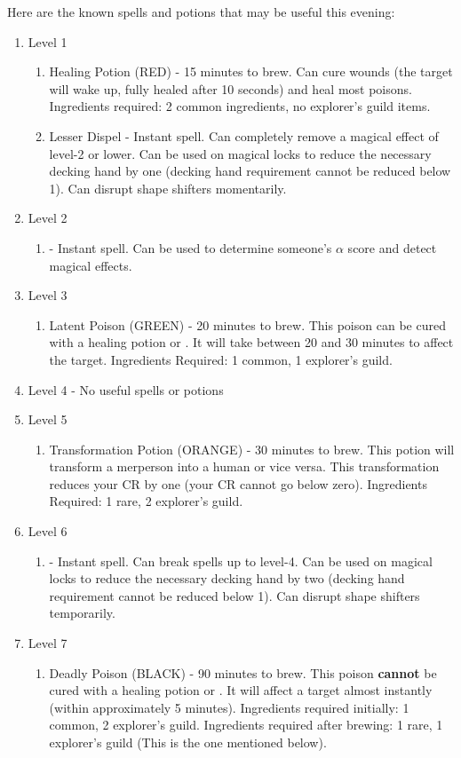 \documentclass[green]{NeptuneBall}
\begin{document}
Here are the known spells and potions that may be useful this evening: %
\begin{enumerate}
  \item Level 1
   \begin{enumerate}
     \item Healing Potion (RED) - 15 minutes to brew. Can cure wounds (the target will wake up, fully healed after 10 seconds) and heal most poisons. Ingredients required: 2 common ingredients, no explorer's guild items.
     \item Lesser Dispel - Instant spell. Can completely remove a magical effect of level-2 or lower. Can be used on magical locks to reduce the necessary decking hand by one (decking hand requirement cannot be reduced below 1). Can disrupt shape shifters momentarily.
   \end{enumerate}
  \item Level 2
   \begin{enumerate}
     \item \aPerceive{} - Instant spell. Can be used to determine someone's $\alpha$ score and detect magical effects.
   \end{enumerate}
  \item Level 3
     \begin{enumerate}
     \item Latent Poison (GREEN) - 20 minutes to brew. This poison can be cured with a healing potion or \aFirstAid{}. It will take between 20 and 30 minutes to affect the target. Ingredients Required: 1 common, 1 explorer's guild.
   \end{enumerate}
   \item Level 4 - No useful spells or potions
   \item Level 5
    \begin{enumerate}
     \item Transformation Potion (ORANGE) - 30 minutes to brew. This potion will transform a merperson into a human or vice versa. This transformation reduces your CR by one (your CR cannot go below zero). Ingredients Required: 1 rare, 2 explorer's guild.
   \end{enumerate}
   \item Level 6
    \begin{enumerate}
      \item \aGreaterDispel{} - Instant spell. Can break spells up to level-4. Can be used on magical locks to reduce the necessary decking hand by two (decking hand requirement cannot be reduced below 1). Can disrupt shape shifters temporarily.
    \end{enumerate}
   \item Level 7
    \begin{enumerate}
      \item Deadly Poison (BLACK) - 90 minutes to brew. This poison {\bf cannot} be cured with a healing potion or \aFirstAid{}. It will affect a target almost instantly (within approximately 5 minutes). Ingredients required initially: 1 common, 2 explorer's guild. Ingredients required after brewing: 1 rare, 1 explorer's guild (This is the one mentioned below).
    \end{enumerate}
\end{enumerate}
\end{document}
